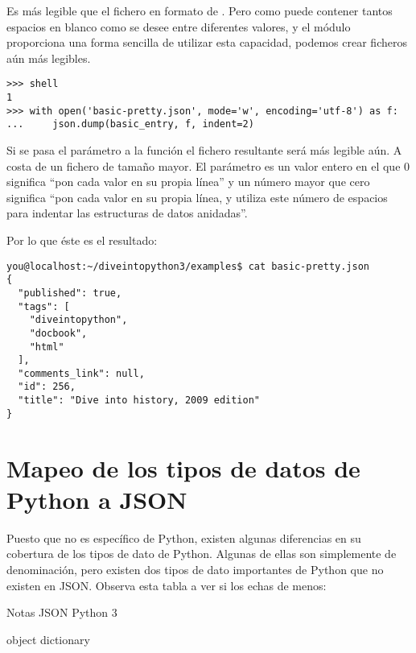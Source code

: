 Es más legible que el fichero en formato de . Pero como  puede contener tantos espacios en blanco como se desee entre diferentes valores, y el módulo  proporciona una forma sencilla de utilizar esta capacidad, podemos crear ficheros  aún más legibles.

\noindent\begin{minipage}{\textwidth}
\begin{lstlisting}[mathescape=False]
>>> shell
1
>>> with open('basic-pretty.json', mode='w', encoding='utf-8') as f:
...     json.dump(basic_entry, f, indent=2) 
\end{lstlisting}
\end{minipage}

Si se pasa el parámetro  a la función  el fichero  resultante será más legible aún. A costa de un fichero de tamaño mayor. El parámetro  es un valor entero en el que 0 significa ``pon cada valor en su propia línea'' y un número mayor que cero significa ``pon cada valor en su propia línea, y utiliza este número de espacios para indentar las estructuras de datos anidadas''.

Por lo que éste es el resultado:

\noindent\begin{minipage}{\textwidth}
\begin{lstlisting}[mathescape=False]
you@localhost:~/diveintopython3/examples$ cat basic-pretty.json
{
  "published": true, 
  "tags": [
    "diveintopython", 
    "docbook", 
    "html"
  ], 
  "comments_link": null, 
  "id": 256, 
  "title": "Dive into history, 2009 edition"
}
\end{lstlisting}
\end{minipage}

\section{Mapeo de los tipos de datos de Python a JSON}

Puesto que  no es específico de Python, existen algunas diferencias en su cobertura de los tipos de dato de Python. Algunas de ellas son simplemente de denominación, pero existen dos tipos de dato importantes de Python que no existen en JSON. Observa esta tabla a ver si los echas de menos:


Notas
JSON
Python 3

object
dictionary

